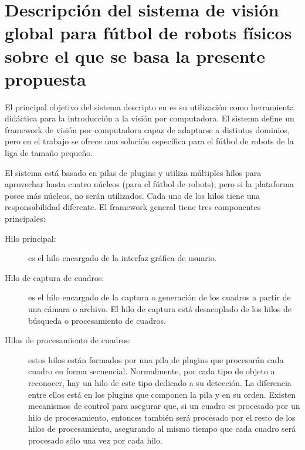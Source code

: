 
\section{Descripción del sistema de visión global para fútbol de robots físicos
sobre el que se basa la presente propuesta}


\label{descripcionSistemaBase}

El principal objetivo del sistema descripto en \cite{torres2014} es su
utilización como herramienta didáctica para la introducción a la visión por
computadora. El sistema define un framework de visión por computadora capaz de
adaptarse a distintos dominios, pero en el trabajo se ofrece una solución
específica para el fútbol de robots de la liga de tamaño pequeño.

El sistema está basado en pilas de plugins y utiliza múltiples hilos para
aprovechar hasta cuatro núcleos (para el fútbol de robots); pero si la
plataforma posee más núcleos, no serán utilizados. Cada uno de los hilos tiene
una responsabilidad diferente. El framework general tiene tres componentes
principales:

\begin{description}

	\item[Hilo principal:] es el hilo encargado de la interfaz gráfica de
		usuario.

	\item[Hilo de captura de cuadros:] es el hilo encargado de la captura o
		generación de los cuadros a partir de una cámara o archivo. El
		hilo de captura está desacoplado de los hilos de búsqueda o
		procesamiento de cuadros.

	\item[Hilos de procesamiento de cuadros:] estos hilos están formados por
		una pila de plugins que procesarán cada cuadro en forma
		secuencial. Normalmente, por cada tipo de objeto a reconocer,
		hay un hilo de este tipo dedicado a su detección. La diferencia
		entre ellos está en los plugins que componen la pila y en su
		orden. Existen mecanismos de control para asegurar que, si un
		cuadro es procesado por un hilo de procesamiento, entonces
		también será procesado por el resto de los hilos de
		procesamiento, asegurando al mismo tiempo que cada cuadro será
		procesado sólo una vez por cada hilo.

\end{description}


